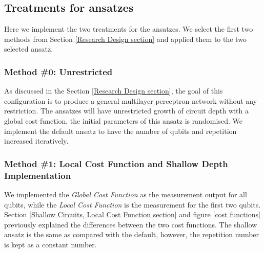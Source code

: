 \subsection{Treatments for ansatzes}
Here we implement the two treatments for the ansatzes.
We select the first two methods from Section \ref{Research Design section} and applied them to the two selected ansatz.

\subsubsection{Method \#0: Unrestricted}
As discussed in the Section \ref{Research Design section}, the goal of this configuration is to produce a general multilayer perceptron network without any restriction.
The ansatzes will have unrestricted growth of circuit depth with a global cost function, the initial parameters of this ansatz is randomised.
We implement the default ansatz to have the number of qubits and repetition increased iteratively.

\subsubsection{Method \#1: Local Cost Function and Shallow Depth Implementation}
We implemented the \textit{Global Cost Function} as the measurement output for all qubits, while the \textit{Local Cost Function} is the measurement for the first two qubits.
Section \ref{Shallow Circuits, Local Cost Function section} and figure \ref{cost functions} previously explained the differences between the two cost functions.
The shallow ansatz is the same as compared with the default, however, the repetition number is kept as a constant number.